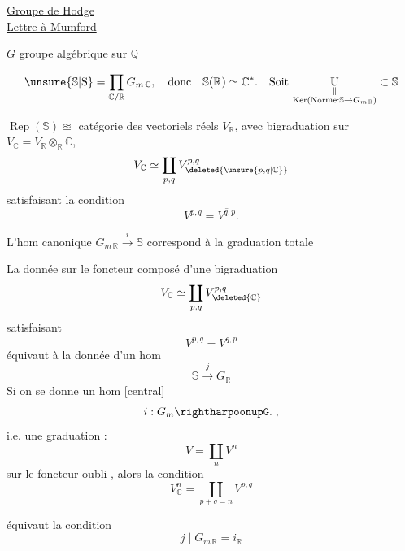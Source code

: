 \begin{flushright}
\uline{Groupe de Hodge}\\
\uline{Lettre à Mumford}
\end{flushright}



$G$ groupe algébrique sur $\mathbb{Q}$

\[
\unsure{\mathbb{S}|\mathrm{S}}=\prod_{\mathbb{C}/\mathbb{R}}G_{m\,\mathbb{C}},\quad
\text{donc}\quad \mathbb{S}(\mathbb{R})\simeq\mathbb{C}^{*}.\quad
\text{Soit }\underset{\substack{\Vert\\
\operatorname{Ker}(\mathrm{Norme}:\mathbb{S}\to G_{m\,\mathbb{R}})}}{\mathbb{U}}\subset\mathbb{S}
\]

$\operatorname{Rep}(\mathbb{S})\approxeq$ catégorie des vectoriels réels $V_{\mathbb{R}}$, avec bigraduation sur $V_{\mathbb{C}}=V_{\mathbb{R}}\otimes_{\mathbb{R}}\mathbb{C}$,
\[
V_{\mathbb{C}}\simeq\coprod_{p,q}V_{\deleted{\unsure{p,q|\mathbb{C}}}}^{p,q}
\]
satisfaisant la condition
\[
V^{p,q}=\overline{V^{q,p}}.
\]

L'hom canonique $G_{m\,\mathbb{R}}\xrightarrow{i}\mathbb{S}$ correspond à la graduation totale


La donnée sur le foncteur composé d'une bigraduation
\[
V_{\mathbb{C}}\simeq\coprod_{p,q}V_{\deleted{\mathbb{C}}}^{p,q}
\]
satisfaisant
\[
V^{p,q}=\overline{V^{q,p}}
\]
équivaut à la donnée d'un hom
\[
\mathbb{S}\xrightarrow{j}G_{\mathbb{R}}
\]
Si on se donne un hom [central]
\[
i:G_m\rightharpoonupG.\;,
\]
i.e. une graduation :
\[
V=\coprod_n V^n
\]
sur le foncteur oubli , alors la condition
\[
V^n_{\mathbb{C}}=\coprod_{p+q=n}V^{p,q}
\]



équivaut  la condition
\[
j\mid G_{m\,\mathbb{R}}=i_{\mathbb{R}}\tag*{(a)}
\]

